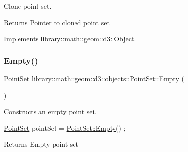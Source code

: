 Clone point set. 

\begin{DoxyReturn}{Returns}
Pointer to cloned point set 
\end{DoxyReturn}


Implements \hyperlink{classlibrary_1_1math_1_1geom_1_1d3_1_1_object_a1a784c6b359e0eb97cd34fabc42f2f3f}{library\+::math\+::geom\+::d3\+::\+Object}.

\mbox{\label{classlibrary_1_1math_1_1geom_1_1d3_1_1objects_1_1_point_set_af4b649e6c97106bf9f54b2213f10484a}} 
\subsubsection{\texorpdfstring{Empty()}{Empty()}}
{\footnotesize\ttfamily \hyperlink{classlibrary_1_1math_1_1geom_1_1d3_1_1objects_1_1_point_set}{Point\+Set} library\+::math\+::geom\+::d3\+::objects\+::\+Point\+Set\+::\+Empty (\begin{DoxyParamCaption}{ }\end{DoxyParamCaption})\hspace{0.3cm}{\ttfamily [static]}}



Constructs an empty point set. 


\begin{DoxyCode}
\hyperlink{classlibrary_1_1math_1_1geom_1_1d3_1_1objects_1_1_point_set_a6f9624b8c6bb3aa9d57a35a6fa2e0fba}{PointSet} pointSet = \hyperlink{classlibrary_1_1math_1_1geom_1_1d3_1_1objects_1_1_point_set_af4b649e6c97106bf9f54b2213f10484a}{PointSet::Empty}() ;
\end{DoxyCode}


\begin{DoxyReturn}{Returns}
Empty point set 
\end{DoxyReturn}
\mbox{\label{classlibrary_1_1math_1_1geom_1_1d3_1_1objects_1_1_point_set_ae9f66fcbe937005a418238929048f587}} 
